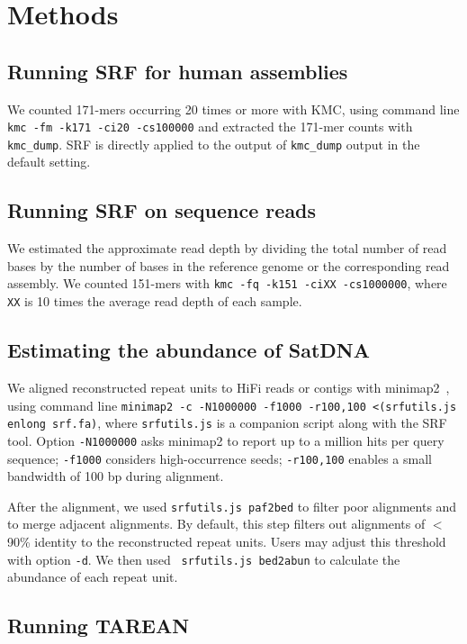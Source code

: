 \documentclass{bioinfo}
\newcommand{\revised}[1]{{\color{blue}#1}}
\begin{document}
\section{Methods}

\subsection{Running SRF for human assemblies}

We counted 171-mers occurring 20 times or more with KMC, using command line
{\tt kmc -fm -k171 -ci20 -cs100000} and extracted the 171-mer counts with
{\tt kmc\_dump}. SRF is directly applied to the output of {\tt kmc\_dump}
output in the default setting.

\subsection{Running SRF on sequence reads}

We estimated the approximate read depth by dividing the total number of read
bases by the number of bases in the reference genome or the corresponding
read assembly. We counted 151-mers with {\tt kmc -fq -k151 -ciXX -cs1000000},
where {\tt XX} is 10 times the average read depth of each sample.

\subsection{Estimating the abundance of SatDNA}

We aligned reconstructed repeat units to HiFi reads or contigs with
minimap2~\citep{Li:2018ab}, using command line {\tt minimap2 -c -N1000000
-f1000 -r100,100 <(srfutils.js enlong srf.fa)}, where {\tt srfutils.js} is a
companion script along with the SRF tool. Option {\tt -N1000000} asks minimap2
to report up to a million hits per query sequence; {\tt -f1000} considers
high-occurrence seeds; {\tt -r100,100} enables a small bandwidth of 100 bp
during alignment.

After the alignment, we used {\tt srfutils.js paf2bed} to filter poor
alignments and to merge adjacent alignments. \revised{By default, this step
filters out alignments of $<$90\% identity to the reconstructed repeat units.
Users may adjust this threshold with option {\tt -d}.} We then used {\tt
srfutils.js bed2abun} to calculate the abundance of each repeat unit.

\subsection{Running TAREAN}
\end{document}
